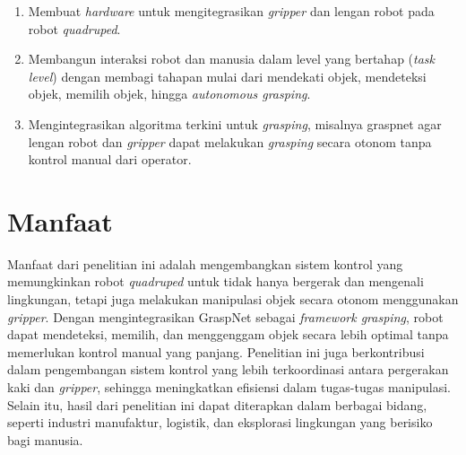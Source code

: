 \begin{enumerate}
    \item Membuat \emph{hardware} untuk mengitegrasikan \emph{gripper} dan lengan robot pada robot \emph{quadruped}.
    \item Membangun interaksi robot dan manusia dalam level yang bertahap (\emph{task level})
    dengan membagi tahapan mulai dari mendekati objek, mendeteksi objek, memilih objek, hingga \emph{autonomous grasping}.
    \item Mengintegrasikan algoritma terkini untuk \emph{grasping}, misalnya graspnet agar
    lengan robot dan \emph{gripper} dapat melakukan \emph{grasping} secara otonom tanpa kontrol manual dari operator.
\end{enumerate}

\section{Manfaat}

Manfaat dari penelitian ini adalah mengembangkan sistem kontrol yang memungkinkan
robot \emph{quadruped} untuk tidak hanya bergerak dan mengenali lingkungan,
tetapi juga melakukan manipulasi objek secara otonom menggunakan \emph{gripper}.
Dengan mengintegrasikan GraspNet sebagai \emph{framework grasping}, robot dapat mendeteksi,
memilih, dan menggenggam objek secara lebih optimal tanpa memerlukan kontrol manual yang panjang.
Penelitian ini juga berkontribusi dalam pengembangan sistem kontrol yang lebih terkoordinasi
antara pergerakan kaki dan \emph{gripper}, sehingga meningkatkan efisiensi dalam tugas-tugas manipulasi.
Selain itu, hasil dari penelitian ini dapat diterapkan dalam berbagai bidang,
seperti industri manufaktur, logistik, dan eksplorasi lingkungan yang berisiko bagi manusia.